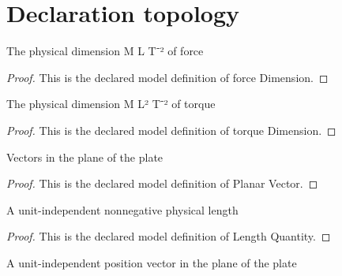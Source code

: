 \section{Declaration topology}
\begin{definition}
  \label{def:physics:phyx-mini-0777:phyxminiproblems-problemphyxmini0777-forcedimension}
  The physical dimension M L T⁻² of force
\end{definition}
\begin{proof}
  This is the declared model definition of force Dimension.
\end{proof}
\begin{definition}
  \label{def:physics:phyx-mini-0777:phyxminiproblems-problemphyxmini0777-torquedimension}
  The physical dimension M L² T⁻² of torque
\end{definition}
\begin{proof}
  This is the declared model definition of torque Dimension.
\end{proof}
\begin{definition}
  \label{def:physics:phyx-mini-0777:phyxminiproblems-problemphyxmini0777-planarvector}
  Vectors in the plane of the plate
\end{definition}
\begin{proof}
  This is the declared model definition of Planar Vector.
\end{proof}
\begin{definition}
  \label{def:physics:phyx-mini-0777:phyxminiproblems-problemphyxmini0777-lengthquantity}
  A unit-independent nonnegative physical length
\end{definition}
\begin{proof}
  This is the declared model definition of Length Quantity.
\end{proof}
\begin{definition}
  \label{def:physics:phyx-mini-0777:phyxminiproblems-problemphyxmini0777-planarpositionquantity}
  A unit-independent position vector in the plane of the plate
\end{definition}
